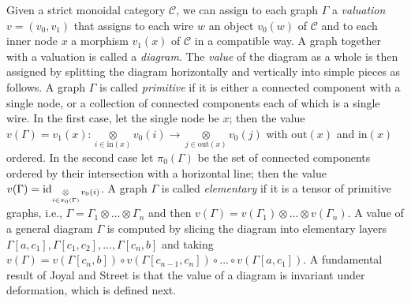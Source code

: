 Given a strict monoidal category $\mathcal{C}$, we can assign to each graph $\Gamma$ a \emph{valuation} $v = (v_0, v_1)$ that assigns to each wire $w$ an object $v_0(w)$ of $\mathcal{C}$ and to each inner node $x$ a morphism $v_1(x)$ of $\mathcal{C}$ in a compatible way.
A graph together with a valuation is called a \emph{diagram}.
The \emph{value} of the diagram as a whole is then assigned by splitting the diagram horizontally and vertically into simple pieces as follows.
A graph $\Gamma$ is called \emph{primitive} if it is either a connected component with a single node, or a collection of connected components each of which is a single wire.
In the first case, let the single node be $x$; then the value $v(\Gamma) = v_1(x) : \mathop{\otimes}\limits_{i \in \mathrm{in}(x)}v_0(i) \to \mathop{\otimes}\limits_{j \in \mathrm{out}(x)}v_0(j)$ with $\mathrm{out}(x)$ and $\mathrm{in}(x)$ ordered.
In the second case let $\pi_0(\Gamma)$ be the set of connected components ordered by their intersection with a horizontal line; then the value $v(\Gamma) = \operatorname{id}_{\mathop{\otimes}\limits_{i \in \pi_0(\Gamma)}v_0(i)}$.
A graph $\Gamma$ is called \emph{elementary} if it is a tensor of primitive graphs, i.e., $\Gamma = \Gamma_1 \otimes \ldots \otimes \Gamma_n$ and then $v(\Gamma) = v(\Gamma_1) \otimes \ldots \otimes v(\Gamma_n)$.
A value of a general diagram $\Gamma$ is computed by slicing the diagram into elementary layers $\Gamma[a, c_1], \Gamma[c_1, c_2], \ldots, \Gamma[c_{n}, b]$ and taking $v(\Gamma) = v(\Gamma[c_n, b]) \circ v(\Gamma[c_{n-1}, c_{n}]) \circ \ldots \circ v(\Gamma[a, c_1])$.
A fundamental result of Joyal and Street is that the value of a diagram is invariant under deformation, which is defined next.

